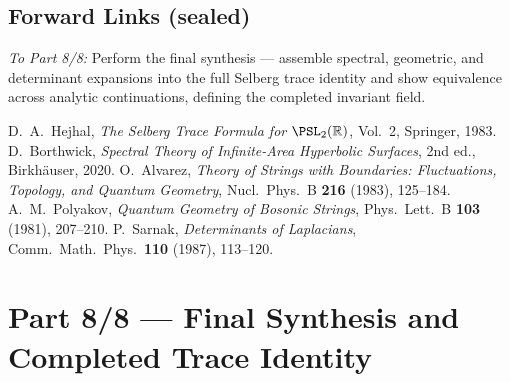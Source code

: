 \subsection*{Forward Links (sealed)}\relax\hspace{0pt}
\noindent
\emph{To Part 8/8:} Perform the final synthesis — assemble spectral, geometric, and determinant expansions into the full Selberg trace identity and show equivalence across analytic continuations, defining the completed invariant field.\relax\hspace{0pt} %

\begin{thebibliography}{9}
 D.~A.~Hejhal, \emph{The Selberg Trace Formula for $\PSL_2(\mathbb{R})$}, Vol.~2, Springer, 1983. %
 D.~Borthwick, \emph{Spectral Theory of Infinite-Area Hyperbolic Surfaces}, 2nd ed., Birkhäuser, 2020. %
 O.~Alvarez, \emph{Theory of Strings with Boundaries: Fluctuations, Topology, and Quantum Geometry}, Nucl.\ Phys.\ B \textbf{216} (1983), 125–184. %
 A.~M.~Polyakov, \emph{Quantum Geometry of Bosonic Strings}, Phys.\ Lett.\ B \textbf{103} (1981), 207–210. %
 P.~Sarnak, \emph{Determinants of Laplacians}, Comm.\ Math.\ Phys.\ \textbf{110} (1987), 113–120. %
\end{thebibliography}


\section*{Part 8/8 — Final Synthesis and Completed Trace Identity}\relax\hspace{0pt}

